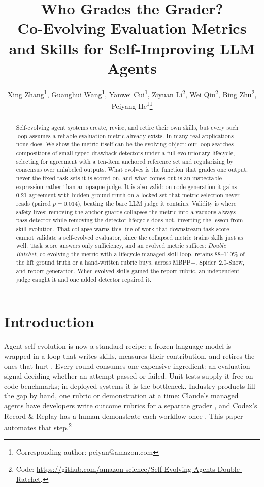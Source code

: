 \documentclass[letterpaper]{article} %
\title{Who Grades the Grader?\\Co-Evolving Evaluation Metrics and Skills for Self-Improving LLM Agents}
\author{
    Xing Zhang\textsuperscript{\rm 1},
    Guanghui Wang\textsuperscript{\rm 1},
    Yanwei Cui\textsuperscript{\rm 1},
    Ziyuan Li\textsuperscript{\rm 2},
    Wei Qiu\textsuperscript{\rm 2},
    Bing Zhu\textsuperscript{\rm 2},
    Peiyang He\textsuperscript{\rm 1}\thanks{Corresponding author: peiyan@amazon.com}
}
\begin{document}
\maketitle

\begin{abstract}
Self-evolving agent systems create, revise, and retire their own skills, but every such loop assumes a reliable evaluation metric already exists. In many real applications none does. We show the metric itself can be the evolving object: our loop searches compositions of small typed drawback detectors under a full evolutionary lifecycle, selecting for agreement with a ten-item anchored reference set and regularizing by consensus over unlabeled outputs. What evolves is the function that grades one output, never the fixed task sets it is scored on, and what comes out is an inspectable expression rather than an opaque judge. It is also valid: on code generation it gains 0.21 agreement with hidden ground truth on a locked set that metric selection never reads (paired $p=0.014$), beating the bare LLM judge it contains. Validity is where safety lives: removing the anchor guards collapses the metric into a vacuous always-pass detector while removing the detector lifecycle does not, inverting the lesson from skill evolution. That collapse warns this line of work that downstream task score cannot validate a self-evolved evaluator, since the collapsed metric trains skills just as well. Task score answers only sufficiency, and an evolved metric suffices: \emph{Double Ratchet}, co-evolving the metric with a lifecycle-managed skill loop, retains 88--110\% of the lift ground truth or a hand-written rubric buys, across MBPP+, Spider~2.0-Snow, and report generation. When evolved skills gamed the report rubric, an independent judge caught it and one added detector repaired it.
\end{abstract}

\section{Introduction}

Agent self-evolution is now a standard recipe: a frozen language model is wrapped in a loop that writes skills, measures their contribution, and retires the ones that hurt \citep{zhang2026ratchet,wang2023voyager,shinn2023reflexion}. Every round consumes one expensive ingredient: an evaluation signal deciding whether an attempt passed or failed. Unit tests supply it free on code benchmarks; in deployed systems it is the bottleneck. Industry products fill the gap by hand, one rubric or demonstration at a time: Claude's managed agents have developers write outcome rubrics for a separate grader \citep{anthropic2026outcomes}, and Codex's Record \& Replay has a human demonstrate each workflow once \citep{openai2026recordreplay}. This paper automates that step.\footnote{Code: \url{https://github.com/amazon-science/Self-Evolving-Agents-Double-Ratchet}.}
\end{document}
